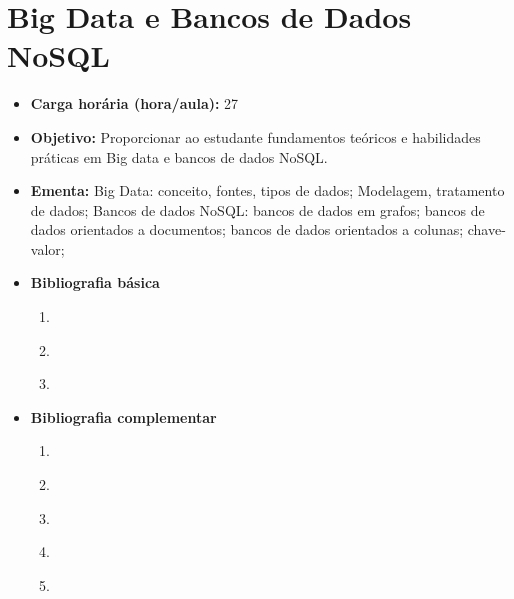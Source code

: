 \documentclass[
	10pt,				%
	openright,			%
	twoside,			%
	a4paper,			%
	english,			%
	french,				%
	brazil,				%
	sumario=tradicional
]{abntex2}
\begin{document}
\section*{Big Data e Bancos de Dados NoSQL}\label{3_nosql}
\begin{itemize}
	\item \textbf{Carga horária (hora/aula):} 27
	\item \textbf{Objetivo:} Proporcionar ao estudante fundamentos teóricos e habilidades práticas em Big data e bancos de dados NoSQL.
	\item \textbf{Ementa:} 
	Big Data: conceito, fontes, tipos de dados;
	Modelagem, tratamento de dados;	
	Bancos de dados NoSQL: bancos de dados em grafos; bancos de dados orientados a documentos; bancos de dados orientados a colunas; chave-valor;
	\item \textbf{Bibliografia básica}
	\begin{enumerate}
		\item \cite{silberschatz2016}
		\item \cite{elmasrinavathe2011}
		\item \cite{date2004}
	\end{enumerate}
	\item \textbf{Bibliografia complementar}
	\begin{enumerate}
		\item \cite{milani2008}
		\item \cite{machado2014}
		\item \cite{angelotti2010}
		\item \cite{cougo1997}
		\item \cite{toby2007}
	\end{enumerate}		
\end{itemize}

\newpage
\end{document}
